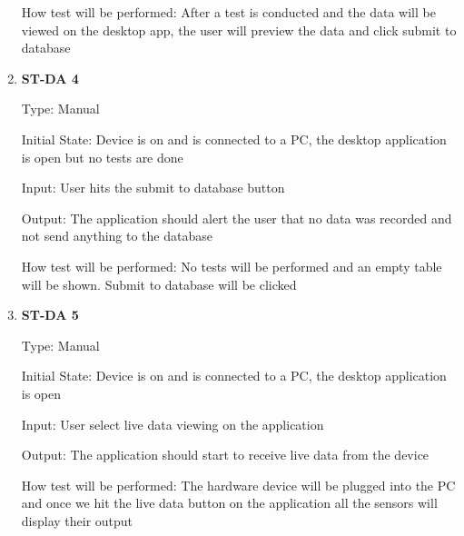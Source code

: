 \documentclass[12pt, titlepage]{article}
\begin{document}
\begin{enumerate}
            
  How test will be performed: After a test is conducted and the data will be viewed on the desktop app, the user will preview the data and click submit to database \\

  \item{\bf{ST-DA 4}}
  
  Type: Manual
            
  Initial State: Device is on and is connected to a PC, the desktop application is open but no tests are done
            
  Input: User hits the submit to database button
            
  Output: The application should alert the user that no data was recorded and not send anything to the database
  
            
  How test will be performed: No tests will be performed and an empty table will be shown. Submit to database will be clicked \\

  \item{\bf{ST-DA 5}}
  
  Type: Manual
            
  Initial State: Device is on and is connected to a PC, the desktop application is open
            
  Input: User select live data viewing on the application
            
  Output: The application should start to receive live data from the device
  
            
  How test will be performed: The hardware device will be plugged into the PC and once we hit the live data button on the application all the sensors will display their output\\

\end{enumerate}
\end{document}
